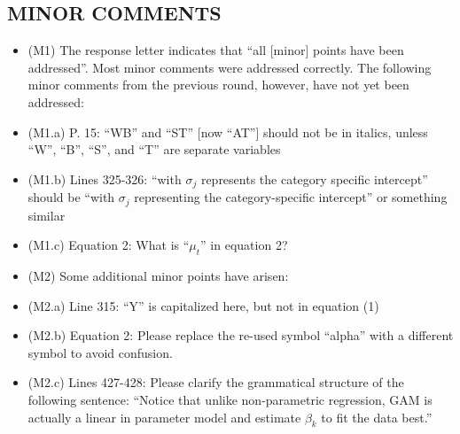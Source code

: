 \documentclass[
]{article}
\begin{document}
\subsection{MINOR COMMENTS}

\begin{itemize}

\item (M1) The response letter indicates that ``all [minor] points have been addressed''. Most minor comments were addressed correctly. The following minor comments from the previous round, however, have not yet been addressed:

\item (M1.a) P. 15: ``WB'' and ``ST'' [now ``AT''] should not be in italics, unless ``W'', ``B'', ``S'', and ``T'' are separate variables

\item (M1.b) Lines 325-326: ``with $\sigma_j$ represents the category specific intercept'' should be ``with $\sigma_j$ representing the category-specific intercept'' or something similar

\item (M1.c) Equation 2: What is ``$\mu_t$'' in equation 2?

\item (M2) Some additional minor points have arisen:

\item (M2.a) Line 315: ``Y'' is capitalized here, but not in equation (1)

\item (M2.b) Equation 2: Please replace the re-used symbol ``alpha'' with a different symbol to avoid confusion.

\item (M2.c) Lines 427-428: Please clarify the grammatical structure of the following sentence: ``Notice that unlike non-parametric regression, GAM is actually a linear in parameter model and estimate $\beta_k$ to fit the data best.''

\end{itemize}
\end{document}
